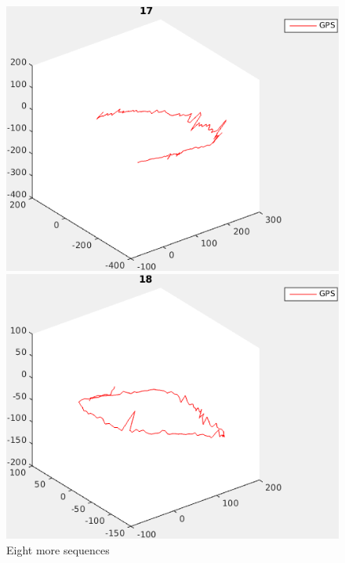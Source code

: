 \documentclass{report}
\begin{document}
\begin{figure}
\begin{minipage}[b]{.5\textwidth}
  \end{minipage}
  \begin{minipage}[b]{.5\textwidth}
    \centering
    \includegraphics[width=.9\textwidth]{17_path}
  \end{minipage}%
  \begin{minipage}[b]{.5\textwidth}
    \centering
    \includegraphics[width=.9\textwidth]{18_path}
  \end{minipage}

  \caption{Eight more sequences}
\end{figure}
\end{document}
